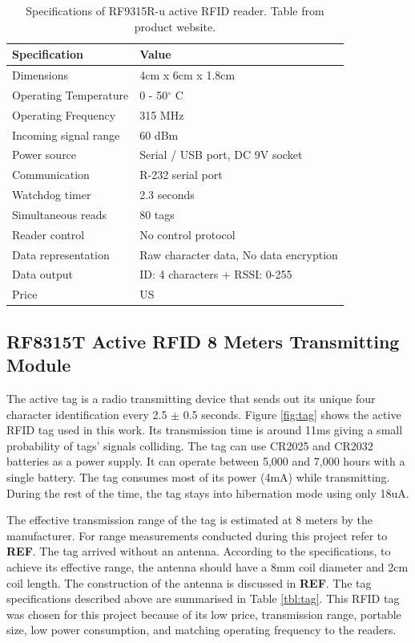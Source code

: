 \begin{table}[h]
	\centering
	\begin{tabular}{ | m{4cm} || m{7cm} | }
		\hline
		\textbf{Specification}	& \textbf{Value} \\ \hline
		Dimensions				& 4cm x 6cm x 1.8cm \\ \hline
		Operating Temperature	& 0 - 50$^\circ$ C	\\ \hline
		Operating Frequency		& 315 MHz	\\ \hline
		Incoming signal range	& 60 dBm \\ \hline
		Power source			& Serial / USB port, DC 9V socket \\ \hline
		Communication			& R-232 serial port \\ \hline
		Watchdog timer			& 2.3 seconds \\ \hline
		Simultaneous reads		& 80 tags	\\ \hline
		Reader control			& No control protocol \\ \hline
		Data representation		& Raw character data, No data encryption	\\ \hline
		Data output				& ID: 4 characters + RSSI: 0-255 \\ \hline
		Price					& US \textdollar 49.95 \\ \hline
	\end{tabular}
	\caption{Specifications of RF9315R-u active RFID reader. Table from product website\protect\footnotemark.}
	\label{tbl:reader}
\end{table}


\subsection{RF8315T Active RFID 8 Meters Transmitting Module}

The active tag is a radio transmitting device that sends out its unique four character identification every 2.5 $\pm$ 0.5 seconds. Figure \ref{fig:tag} shows the active RFID tag used in this work. Its transmission time is around 11ms giving a small probability of tags' signals colliding. The tag can use CR2025 and CR2032 batteries as a power supply. It can operate between 5,000 and 7,000 hours with a single battery. The tag consumes most of its power (4mA) while transmitting. During the rest of the time, the tag stays into hibernation mode using only 18uA.

The effective transmission range of the tag is estimated at 8 meters by the manufacturer. For range measurements conducted during this project refer to \textbf{REF}. The tag arrived without an antenna. According to the specifications, to achieve its effective range, the antenna should have a 8mm coil diameter and 2cm coil length. The construction of the antenna is discussed in \textbf{REF}. The tag specifications described above are summarised in Table \ref{tbl:tag}. This RFID tag was chosen for this project because of its low price, transmission range, portable size, low power consumption, and matching operating frequency to the readers.

